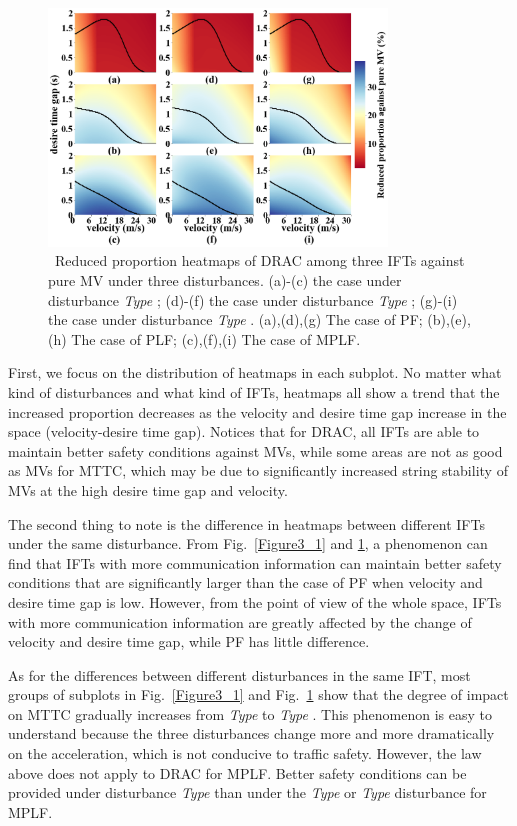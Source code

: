 \documentclass[journal]{IEEEtran}
\begin{document}
\begin{figure}
  \includegraphics[width=9cm]{fig5.3_2.png}
  \caption{~Reduced proportion heatmaps of DRAC among three IFTs against pure MV under three disturbances. (a)-(c) the case under disturbance \textit{Type \uppercase\expandafter{}}; (d)-(f) the case under disturbance \textit{Type \uppercase\expandafter{}}; (g)-(i) the case under disturbance \textit{Type \uppercase\expandafter{}}. (a),(d),(g) The case of PF; (b),(e),(h) The case of PLF; (c),(f),(i) The case of MPLF.} 
  \label{Figure3_2}
\end{figure}

First, we focus on the distribution of heatmaps in each subplot. No matter what kind of disturbances and what kind of IFTs, heatmaps all show a trend that the increased proportion decreases as the velocity and desire time gap increase in the space (velocity-desire time gap). Notices that for DRAC, all IFTs are able to maintain better safety conditions against MVs, while some areas are not as good as MVs for MTTC, which may be due to significantly increased string stability of MVs at the high desire time gap and velocity.

The second thing to note is the difference in heatmaps between different IFTs under the same disturbance. From Fig.~\ref{Figure3_1} and \ref{Figure3_2}, a phenomenon can find that IFTs with more communication information can maintain better safety conditions that are significantly larger than the case of PF when velocity and desire time gap is low. However, from the point of view of the whole space, IFTs with more communication information are greatly affected by the change of velocity and desire time gap, while PF has little difference.

As for the differences between different disturbances in the same IFT, most groups of subplots in Fig.~\ref{Figure3_1} and Fig.~\ref{Figure3_2} show that the degree of impact on MTTC gradually increases from \textit{Type \uppercase\expandafter{}} to \textit{Type \uppercase\expandafter{}}. This phenomenon is easy to understand because the three disturbances change more and more dramatically on the acceleration, which is not conducive to traffic safety. However, the law above does not apply to DRAC for MPLF. Better safety conditions can be provided under disturbance \textit{Type \uppercase\expandafter{}} than under the \textit{Type \uppercase\expandafter{}} or \textit{Type \uppercase\expandafter{}} disturbance for MPLF.
\end{document}
